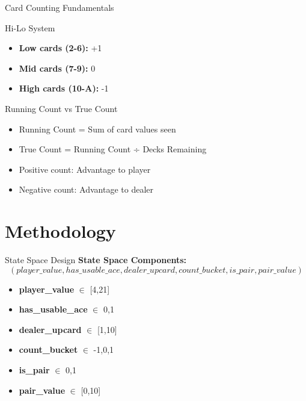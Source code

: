 \documentclass{beamer}
\begin{document}
\begin{frame}{Card Counting Fundamentals}
    \begin{block}{Hi-Lo System}
        \begin{itemize}
            \item \textbf{Low cards (2-6):} +1
            \item \textbf{Mid cards (7-9):} 0
            \item \textbf{High cards (10-A):} -1
        \end{itemize}
    \end{block}
    
    \begin{block}{Running Count vs True Count}
        \begin{itemize}
            \item Running Count = Sum of card values seen
            \item True Count = Running Count ÷ Decks Remaining
            \item Positive count: Advantage to player
            \item Negative count: Advantage to dealer
        \end{itemize}
    \end{block}
\end{frame}

\section{Methodology}

\begin{frame}{State Space Design}
    \textbf{State Space Components:}
    \[(player\_value, has\_usable\_ace, dealer\_upcard, count\_bucket, is\_pair, pair\_value)\]
    
    \begin{itemize}
        \item \textbf{player\_value} \(\in\) [4,21]
        \item \textbf{has\_usable\_ace} \(\in\) {0,1}
        \item \textbf{dealer\_upcard} \(\in\) [1,10]
        \item \textbf{count\_bucket} \(\in\) {-1,0,1}
        \item \textbf{is\_pair} \(\in\) {0,1}
        \item \textbf{pair\_value} \(\in\) [0,10]
    \end{itemize}
\end{frame}
\end{document}

